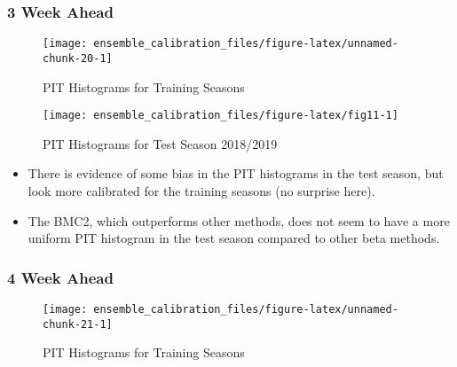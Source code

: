 \documentclass[
]{article}
\begin{document}
\newpage

\hypertarget{week-ahead-10}{%
\subsubsection{3 Week Ahead}\label{week-ahead-10}}

\begin{figure}[H]

{\centering \texttt{[image: ensemble\_calibration\_files/figure-latex/unnamed-chunk-20-1]} 

}

\caption{PIT Histograms for Training Seasons}\label{fig:unnamed-chunk-20}
\end{figure}

\newpage

\begin{figure}[H]

{\centering \texttt{[image: ensemble\_calibration\_files/figure-latex/fig11-1]} 

}

\caption{PIT Histograms for Test Season 2018/2019}\label{fig:fig11}
\end{figure}

\begin{itemize}
\item There is evidence of some bias in the PIT histograms in the test season, but look more calibrated for the training seasons (no surprise here).
\item The BMC2, which outperforms other methods, does not seem to have a more uniform PIT histogram in the test season compared to other beta methods.
\end{itemize}

\newpage

\hypertarget{week-ahead-11}{%
\subsubsection{4 Week Ahead}\label{week-ahead-11}}

\begin{figure}[H]

{\centering \texttt{[image: ensemble\_calibration\_files/figure-latex/unnamed-chunk-21-1]} 

}

\caption{PIT Histograms for Training Seasons}\label{fig:unnamed-chunk-21}
\end{figure}

\newpage
\end{document}
